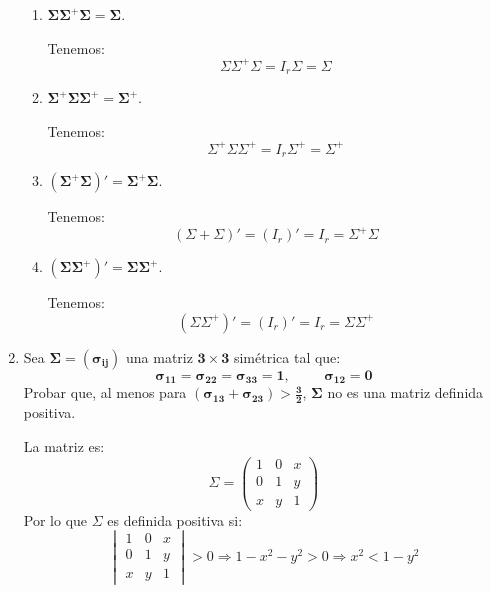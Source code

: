 \documentclass[11pt,a4paper]{article}
\begin{document}
\begin{enumerate}[label=\arabic*.]
\vspace{1cm}
\begin{enumerate}[label=\alph*)]
\item $\mathbf{\Sigma\Sigma^{+}\Sigma = \Sigma}$.
\vspace{0.5cm}
\normalfont

Tenemos:
$$\Sigma\Sigma^{+}\Sigma = I_{r} \Sigma = \Sigma$$

\vspace{1cm}
\item $\mathbf{\Sigma^{+}\Sigma\Sigma^{+} = \Sigma^{+}}$.
\vspace{0.5cm}
\normalfont

Tenemos:
$$\Sigma^{+}\Sigma\Sigma^{+} = I_{r} \Sigma^{+} = \Sigma^{+}$$

\vspace{1cm}
\item $\mathbf{(\Sigma^{+}\Sigma)' = \Sigma^{+}\Sigma}$.
\vspace{0.5cm}
\normalfont

Tenemos:
$$(\Sigma+\Sigma)' = (I_{r})' = I_{r} = \Sigma^{+}\Sigma$$

\vspace{1cm}
\item $\mathbf{(\Sigma\Sigma^{+})' = \Sigma\Sigma^{+}}$.
\vspace{0.5cm}
\normalfont

Tenemos:
$$(\Sigma\Sigma^{+})' = (I_{r})' = I_{r} = \Sigma\Sigma^{+}$$
\end{enumerate}

\newpage
\bfseries
\item Sea $\mathbf{\Sigma = (\sigma_{ij})}$ una matriz $\mathbf{3 \times 3}$ simétrica tal que:
$$\mathbf{\sigma_{11} = \sigma_{22} = \sigma_{33} = 1, \hspace{1cm} \sigma_{12} = 0}$$
Probar que, al menos para $\mathbf{(\sigma_{13} + \sigma_{23}) > \frac{3}{2}}$, $\mathbf{\Sigma}$ no es una matriz definida positiva.
\vspace{0.5cm}
\normalfont

La matriz es:
$$\Sigma = \begin{pmatrix}
1 & 0 & x \\
0 & 1 & y \\
x & y & 1
\end{pmatrix}$$
Por lo que $\Sigma$ es definida positiva si:
$$\begin{vmatrix}
1 & 0 & x \\
0 & 1 & y \\
x & y & 1
\end{vmatrix} > 0 \Rightarrow 1 - x^{2} - y^{2} > 0 \Rightarrow x^{2} < 1 - y^{2}$$


\end{enumerate}
\end{document}
